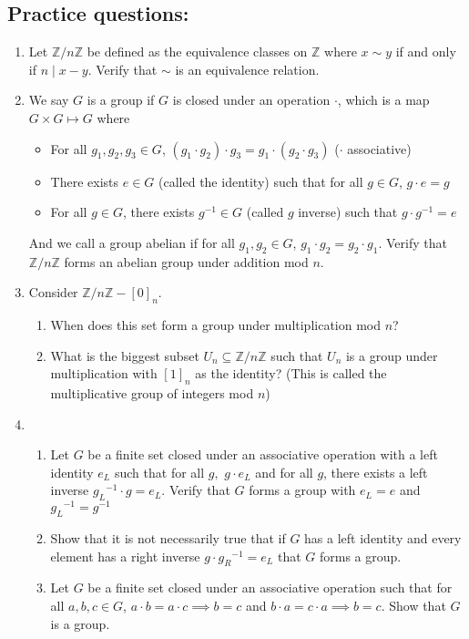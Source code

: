 \documentclass[letterpaper,12pt]{article}
\begin{document}
\subsection*{Practice questions:}
\begin{enumerate}
\item Let $\mathbb{Z}/n\mathbb{Z}$ be defined as the equivalence classes on $\mathbb{Z}$ where $x \sim y$ if and only if $n \mid x-y$. Verify that $\sim$ is an equivalence relation.
\item We say $G$ is a group if $G$ is closed under an operation $\cdot$, which is a map $G \times G \mapsto G$ where \begin{itemize}
    \item For all $g_1,g_2,g_3 \in G$, $(g_1\cdot g_2)\cdot g_3 = g_1\cdot(g_2 \cdot g_3)$ ($\cdot$ associative)
    \item There exists $e \in G$ (called the identity) such that for all $g \in G$, $g \cdot e = g$
    \item For all $g \in G$, there exists $g^{-1} \in G$ (called $g$ inverse) such that $g \cdot g^{-1} =  e$
\end{itemize}
And we call a group abelian if for all $g_1,g_2 \in G$, $g_1 \cdot g_2 = g_2 \cdot g_1$. Verify that $\mathbb{Z}/n\mathbb{Z}$ forms an abelian group under addition mod $n$.
\item Consider $\mathbb{Z}/n\mathbb{Z} - [0]_n$. \begin{enumerate}
    \item When does this set form a group under multiplication mod $n$?
    \item What is the biggest subset $U_n \subseteq \mathbb{Z}/n\mathbb{Z}$ such that $U_n$ is a group under multiplication with $[1]_n$ as the identity? (This is called the multiplicative group of integers mod $n$)
\end{enumerate} 
\item \begin{enumerate}
    \item Let $G$ be a finite set closed under an associative operation with a left identity $e_L$ such that for all $g,$ $ g\cdot e_L$ and for all $g$, there exists a left inverse ${g_L}^{-1} \cdot g = e_L$. Verify that $G$ forms a group with $e_L = e$ and ${g_L}^{-1}=g^{-1}$
    \item Show that it is not necessarily true that if $G$ has a left identity and every element has a right inverse $g \cdot {g_R}^{-1}  = e_L$ that $G$ forms a group.
    \item Let $G$ be a finite set closed under an associative operation such that for all $a,b,c \in G$, $a\cdot b = a \cdot c \implies b = c$ and $b\cdot a = c\cdot a \implies b=c$. Show that $G$ is a group.

\end{enumerate}
\end{enumerate}
\end{document}

